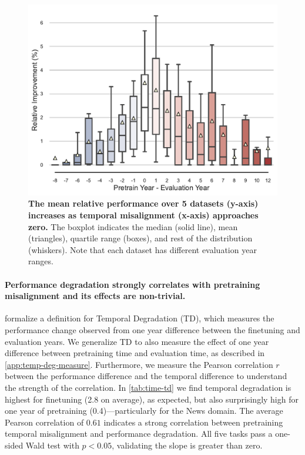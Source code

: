 \documentclass{article}
\begin{document}
\begin{figure}[ht]
    \centering
    \includegraphics[width=0.6\linewidth]{fables/time/temporal_degradation_xl.pdf}
    \caption{
    \small
    \textbf{The mean relative performance over 5 datasets (y-axis) increases as temporal misalignment (x-axis) approaches zero.}
    The boxplot indicates the median (solid line), mean (triangles), quartile range (boxes), and rest of the distribution (whiskers).
    Note that each dataset has different evaluation year ranges.
    }
    \vspace{-3mm}
    \label{fig:temporal-degradation-xl}
\end{figure}

\vspace{-3mm}
\paragraph{Performance degradation strongly correlates with pretraining misalignment and its effects are non-trivial.}
\citet{luu2021time} formalize a definition for Temporal Degradation (TD), which measures the performance change observed from one year difference between the finetuning and evaluation years.
We generalize TD to also measure the effect of one year difference between pretraining time and evaluation time, as described in \cref{app:temp-deg-measure}.
Furthermore, we measure the Pearson correlation $r$ between the performance difference and the temporal difference to understand the strength of the correlation.
In \cref{tab:time-td} we find temporal degradation is highest for finetuning (2.8 on average), as expected, but also surprisingly high for one year of pretraining (0.4)---particularly for the News domain.
The average Pearson correlation of $0.61$ indicates a strong correlation between pretraining temporal misalignment and performance degradation.
All five tasks pass a one-sided Wald test with $p<0.05$, validating the slope is greater than zero.
\end{document}
